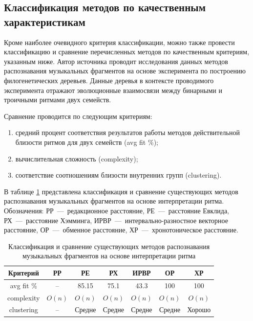 \subsection{Классификация методов по качественным характеристикам}
Кроме наиболее очевидного критерия классификации, можно также провести классификацию и сравнение перечисленных методов по  качественным критериям, указанным ниже. Автор источника \cite{bib12} проводит исследования данных методов распознавания музыкальных фрагментов на основе эксперимента по построению филогенетических деревьев. Данные деревья в контексте проводимого эксперимента отражают эволюционные взаимосвязи между бинарными и троичными ритмами двух семейств.

Сравнение проводится по следующим критериям:
\begin{enumerate}
	\item средний процент соответствия результатов работы методов действительной близости ритмов для двух семейств (avg fit \%);
	\item вычислительная сложность (complexity);
	\item соответствие соотношениям близости внутренних групп (clustering).
\end{enumerate}

В таблице \ref{tbl:class} представлена классификация и сравнение существующих методов распознавания музыкальных фрагментов на основе интерпретации ритма. Обозначения: РР~---~редакционное расстояние, РЕ~---~расстояние Евклида, РХ~---~расстояние Хэмминга, ИРВР~---~интервально-разностное векторное расстояние, ОР~---~обменное расстояние, ХР~---~хронотоническое расстояние.

\begin{table}[H]
	\begin{center}
		\centering
		\caption{Классификация и сравнение существующих методов распознавания музыкальных фрагментов на основе интерпретации ритма}
		\label{tbl:class}
		\begin{tabular}{|c|c|c|c|c|c|c|} 
			
			\hline
			\multicolumn{1}{|c|}{Критерий}
			&  \multicolumn{1}{c|}{РР}
			&  \multicolumn{1}{c|}{РЕ}
			&  \multicolumn{1}{c|}{РХ}
			&  \multicolumn{1}{c|}{ИРВР}
			&  \multicolumn{1}{c|}{ОР}
			&  \multicolumn{1}{c|}{ХР}\\
			\hline
			
			avg fit \% & -- & 85.15 & 75.1 & 43.3 & 100 & 100\\ \hline
			complexity & $O(n)$ & $O(n)$ & $O(n)$ & $O(n)$ & $O(n)$ & $O(n)$\\ \hline
			clustering & -- & Средне & Средне & Средне & Средне & Хорошо\\ \hline
			
		\end{tabular}
	\end{center}
\end{table}

